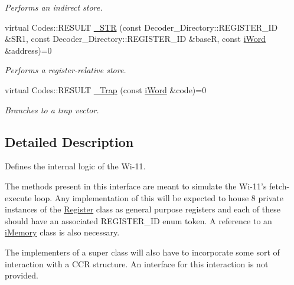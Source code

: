 \begin{DoxyCompactItemize}
\begin{DoxyCompactList}\small\item\em Performs an indirect store. \item\end{DoxyCompactList}\item 
virtual Codes::RESULT \hyperlink{classiWi11_aec2d6cb4a20c44ce3f9468964831d39b}{\_\-STR} (const Decoder\_\-Directory::REGISTER\_\-ID \&SR1, const Decoder\_\-Directory::REGISTER\_\-ID \&baseR, const \hyperlink{classiWord}{iWord} \&address)=0
\begin{DoxyCompactList}\small\item\em Performs a register-\/relative store. \item\end{DoxyCompactList}\item 
virtual Codes::RESULT \hyperlink{classiWi11_a74da9304180f3cbece4b7e87e8a53a5d}{\_\-Trap} (const \hyperlink{classiWord}{iWord} \&code)=0
\begin{DoxyCompactList}\small\item\em Branches to a trap vector. \item\end{DoxyCompactList}\end{DoxyCompactItemize}


\subsection{Detailed Description}
Defines the internal logic of the Wi-\/11. \begin{DoxyParagraph}{}
The methods present in this interface are meant to simulate the Wi-\/11's fetch-\/execute loop. Any implementation of this will be expected to house 8 private instances of the \hyperlink{classRegister}{Register} class as general purpose registers and each of these should have an associated REGISTER\_\-ID enum token. A reference to an \hyperlink{classiMemory}{iMemory} class is also necessary.
\end{DoxyParagraph}
\begin{DoxyParagraph}{}
The implementers of a super class will also have to incorporate some sort of interaction with a CCR structure. An interface for this interaction is not provided. 
\end{DoxyParagraph}


